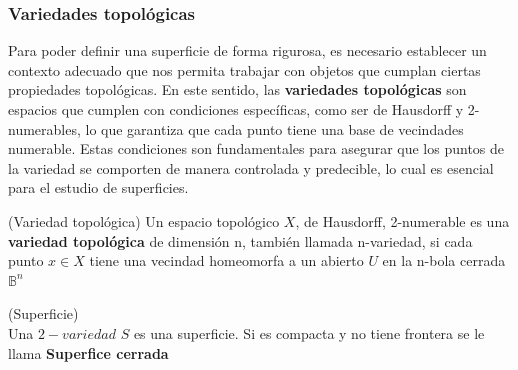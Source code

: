 \subsubsection{Variedades topológicas}

Para poder definir una superficie de forma rigurosa, es necesario establecer un contexto adecuado que nos permita trabajar con objetos que cumplan ciertas propiedades topológicas. En este sentido, las \textbf{variedades topológicas} son espacios que cumplen con condiciones específicas, como ser de Hausdorff y 2-numerables, lo que garantiza que cada punto tiene una base de vecindades numerable. Estas condiciones son fundamentales para asegurar que los puntos de la variedad se comporten de manera controlada y predecible, lo cual es esencial para el estudio de superficies.

\begin{definition}(Variedad topológica)
    Un espacio topológico $X$, de Hausdorff, 2-numerable es una \textbf{variedad topológica} de dimensión n, también llamada n-variedad, si cada punto $x \in X$ tiene una vecindad homeomorfa a un abierto $U$ en la n-bola cerrada $\mathbb{B}^n$
\end{definition}

\begin{definition}
    (Superficie)\\
        Una $2-variedad$ $S$ es una superficie. Si es compacta y no tiene frontera se le llama \textbf{Superfice cerrada}
\end{definition}

